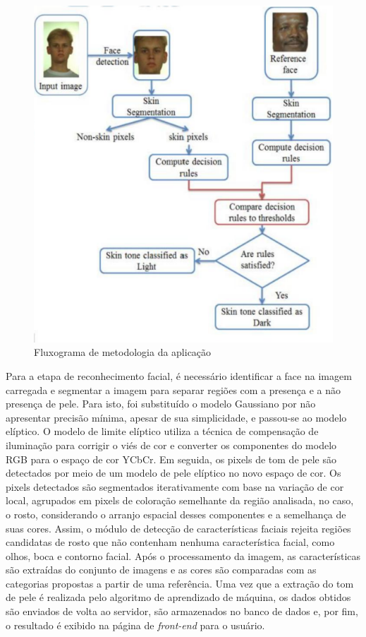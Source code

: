 \begin{figure}[h]
\centering
\caption{Fluxograma de metodologia da aplicação}
\includegraphics[]{Template_Latex_TCC-UNIFTEC/_lib/imagens/human_skin_detection.png}

\label{fig:x human_detection}
\end{figure}

Para a etapa de reconhecimento facial, é necessário identificar a face na imagem carregada e segmentar a imagem para separar regiões com a presença e a não presença de pele. Para isto, foi substituído o modelo Gaussiano por não apresentar precisão mínima, apesar de sua simplicidade, e passou-se ao modelo elíptico. O modelo de limite elíptico utiliza a técnica de compensação de iluminação para corrigir o viés de cor e converter os componentes do modelo RGB para o espaço de cor YCbCr. Em seguida, os pixels de tom de pele são detectados por meio de um modelo de pele elíptico no novo espaço de cor. Os pixels detectados são segmentados iterativamente com base na variação de cor local, agrupados em pixels de coloração semelhante da região analisada, no caso, o rosto, considerando o arranjo espacial desses componentes e a semelhança de suas cores. Assim, o módulo de detecção de características faciais rejeita regiões candidatas de rosto que não contenham nenhuma característica facial, como olhos, boca e contorno facial. Após o processamento da imagem, as características são extraídas do conjunto de imagens e as cores são comparadas com as categorias propostas a partir de uma referência. Uma vez que a extração do tom de pele é realizada pelo algoritmo de aprendizado de máquina, os dados obtidos são enviados de volta ao servidor, são armazenados no banco de dados e, por fim, o resultado é exibido na página de \textit{front-end} para o usuário.


